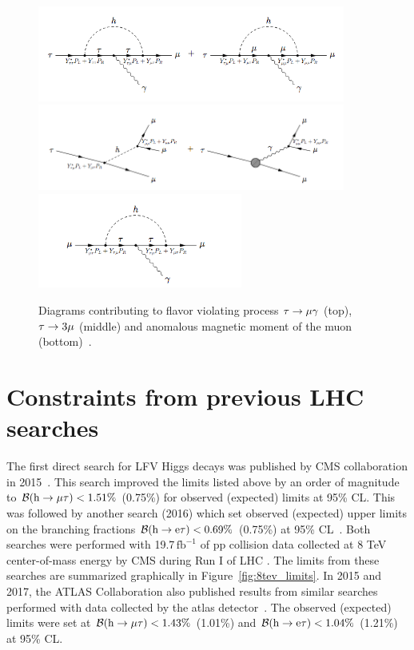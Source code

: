 \begin{figure}[hbtp]
 \begin{center}
   \includegraphics[width=0.9\textwidth]{plots_and_figures/chapter2/tau_mugamma.png}\\
   \includegraphics[width=0.9\textwidth]{plots_and_figures/chapter2/tau_3mu.png}\\
   \includegraphics[width=0.6\textwidth]{plots_and_figures/chapter2/dipole.png}
   \caption{Diagrams contributing to flavor violating process $\tau\rightarrow\mu\gamma$ (top), $\tau\rightarrow 3\mu$ (middle) and anomalous magnetic moment of the muon (bottom)~\cite{Harnik:2012pb}.}
   \label{fig:prelhclfv}
 \end{center}
\end{figure}

\section{Constraints from previous LHC searches}

The first direct search for LFV Higgs decays was published by CMS collaboration in 2015~\cite{Khachatryan:2015kon}. This search improved the limits listed above by an order of magnitude to $\mathcal{B}(\text{h} \to \mu \tau)<1.51\%$ (0.75\%) for observed (expected) limits at 95\% CL. This was followed by another search (2016) which set observed (expected) upper limits on the branching fractions  $\mathcal{B}(\text{h} \to \text{e} \tau)<0.69\%$ (0.75\%) at 95\% CL~\cite{HIG-14-040}. Both searches were performed with 19.7\,$\mathrm{fb}^{-1}$ of pp collision data collected at 8 TeV center-of-mass energy by CMS during Run I of LHC . The limits from these searches are summarized graphically in Figure~\ref{fig:8tev_limits}. In 2015 and 2017, the ATLAS Collaboration also published results from similar searches performed with data collected by the atlas detector~\cite{Aad:2016blu,Aad:2015gha}. The observed (expected) limits were set at $\mathcal{B}(\text{h} \to \mu \tau)<1.43\%$ (1.01\%) and $\mathcal{B}(\text{h} \to \text{e} \tau)<1.04\%$ (1.21\%) at 95\% CL.

